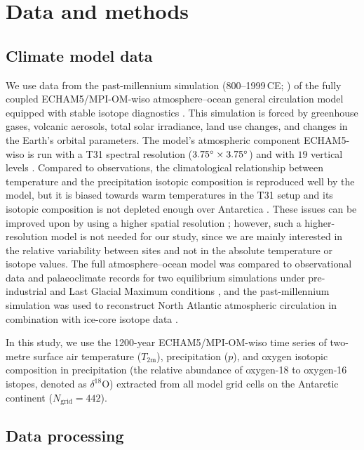 \documentclass[cp, manuscript]{copernicus}
\begin{document}
\section{Data and methods}\label{methods}

\subsection{Climate model data}\label{methods:data}

We use data from the past-millennium simulation (800--1999\,CE;
\citealp{Sjolte2018}) of the fully coupled ECHAM5/MPI-OM-wiso atmosphere--ocean
general circulation model equipped with stable isotope diagnostics
\citep{Werner2016}. This simulation is forced by greenhouse gases, volcanic
aerosols, total solar irradiance, land use changes, and changes in the Earth's
orbital parameters. The model's atmospheric component ECHAM5-wiso is run with
a T31 spectral resolution ($3.75^{\circ}\times3.75^{\circ}$) and with $19$
vertical levels \citep{Sjolte2018}. Compared to observations, the climatological
relationship between temperature and the precipitation isotopic composition is
reproduced well by the model, but it is biased towards warm temperatures in the
T31 setup and its isotopic composition is not depleted enough over Antarctica
\citep{Werner2011}. These issues can be improved upon by using a higher spatial
resolution \citep{Werner2011}; however, such a higher-resolution model is not
needed for our study, since we are mainly interested in the relative variability
between sites and not in the absolute temperature or isotope values. The full
atmosphere--ocean model was compared to observational data and palaeoclimate
records for two equilibrium simulations under pre-industrial and Last Glacial
Maximum conditions \citep{Werner2016}, and the past-millennium simulation was
used to reconstruct North Atlantic atmospheric circulation in combination with
ice-core isotope data \citep{Sjolte2018}.

In this study, we use the 1200-year ECHAM5/MPI-OM-wiso time series of two-metre
surface air temperature ($T_{2\mathrm{m}}$), precipitation ($p$), and oxygen
isotopic composition in precipitation (the relative abundance of oxygen-18 to
oxygen-16 istopes, denoted as $\delta^{18}\mathrm{O}$) extracted from all model
grid cells on the Antarctic continent ($N_{\mathrm{grid}}=442$).

\subsection{Data processing}\label{methods:prc}
\end{document}
